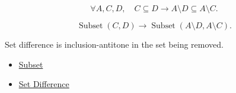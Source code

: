 \begin{remark*}
\[
  \forall A,C,D,\quad C\subseteq D\to A\setminus D\subseteq A\setminus C.
\]
\end{remark*}

\begin{remark*}
\[
  \operatorname{Subset}(C,D)
  \to
  \operatorname{Subset}(A\setminus D,A\setminus C).
\]
\end{remark*}

\begin{remark*}[Interpretation]
Set difference is inclusion-antitone in the set being removed.
\end{remark*}


\begin{dependencies}
\begin{itemize}
  \item \hyperref[def:subset]{Subset}
  \item \hyperref[def:set-difference]{Set Difference}
\end{itemize}
\end{dependencies}
